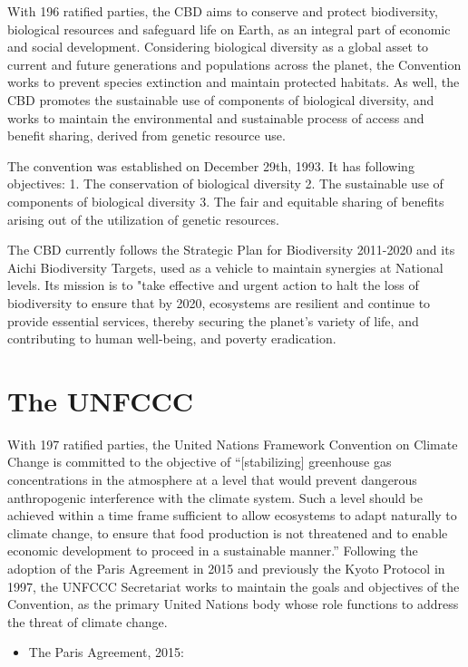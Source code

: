 \documentclass[
]{book}
\providecommand{\tightlist}{%
  \setlength{\itemsep}{0pt}\setlength{\parskip}{0pt}}
\begin{document}
With 196 ratified parties, the CBD aims to conserve and protect biodiversity, biological resources and safeguard life on Earth, as an integral part of economic and social development. Considering biological diversity as a global asset to current and future generations and populations across the planet, the Convention works to prevent species extinction and maintain protected habitats. As well, the CBD promotes the sustainable use of components of biological diversity, and works to maintain the environmental and sustainable process of access and benefit sharing, derived from genetic resource use.

The convention was established on December 29th, 1993. It has following objectives:
1. The conservation of biological diversity
2. The sustainable use of components of biological diversity
3. The fair and equitable sharing of benefits arising out of the utilization of genetic resources.

The CBD currently follows the Strategic Plan for Biodiversity 2011-2020 and its Aichi Biodiversity Targets, used as a vehicle to maintain synergies at National levels. Its mission is to "take effective and urgent action to halt the loss of biodiversity to ensure that by 2020, ecosystems are resilient and continue to provide essential services, thereby securing the planet's variety of life, and contributing to human well-being, and poverty eradication.

\hypertarget{the-unfccc}{%
\section{The UNFCCC}\label{the-unfccc}}

With 197 ratified parties, the United Nations Framework Convention on Climate Change is committed to the objective of ``{[}stabilizing{]} greenhouse gas concentrations in the atmosphere at a level that would prevent dangerous anthropogenic interference with the climate system. Such a level should be achieved within a time frame sufficient to allow ecosystems to adapt naturally to climate change, to ensure that food production is not threatened and to enable economic development to proceed in a sustainable manner.'' Following the adoption of the Paris Agreement in 2015 and previously the Kyoto Protocol in 1997, the UNFCCC Secretariat works to maintain the goals and objectives of the Convention, as the primary United Nations body whose role functions to address the threat of climate change.

\begin{itemize}
\tightlist
\item
  The Paris Agreement, 2015:
\end{itemize}
\end{document}
